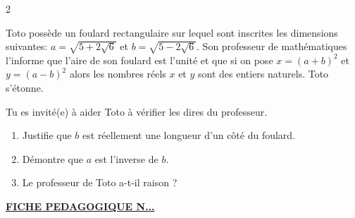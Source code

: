 \begin{multicols*}{2}
  	\begin{center}
  	\end{center}
  	
  	\hspace{0.4cm} Toto possède un foulard rectangulaire sur lequel sont inscrites les dimensions suivantes: $a=\sqrt{5+2\sqrt{6}}$ et $b=\sqrt{5-2\sqrt{6}}$. Son professeur de mathématiques l'informe que  l'aire de son foulard est l'unité et que si on pose $x=(a+b)^2$ et $y=(a-b)^2$ alors les nombres réels $x$ et $y$ sont des entiers naturels. Toto s'étonne.
  	
  	Tu es invité(e) à aider Toto à vérifier les dires du professeur.
  	\begin{enumerate}
  		\item Justifie que $b$ est réellement une longueur d'un côté du foulard.
  		\item Démontre que $a$ est l'inverse de $b$.
  		\item Le professeur de Toto a-t-il raison ?
  	\end{enumerate} 
  	\doc
  \end{multicols*}
  \newpage
   \newpage
 \begin{center}
 	\underline{\textbf{\Large FICHE PEDAGOGIQUE N...}}
 \end{center}
